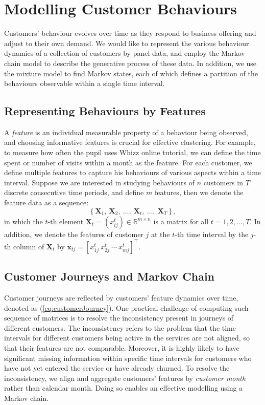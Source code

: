 \section{Modelling Customer Behaviours}
\label{sec:model}

Customers' behaviour evolves over time as they respond to business offering and adjust to their own demand. We would like to represent the various behaviour dynamics of a collection of customers by panel data, and employ the Markov chain model to describe the generative process of these data. In addition, we use the mixture model to find Markov states, each of which defines a partition of the behaviours observable within a single time interval.

\subsection{Representing Behaviours by Features}

A \textit{feature} is an individual measurable property of a behaviour being observed, and choosing informative features is crucial for effective clustering. For example, to measure how often the pupil uses Whizz online tutorial, we can define the time spent or number of visits within a month as the feature. For each customer, we define multiple features to capture his behaviours of various aspects within a time interval. Suppose we are interested in studying behaviours of $n$ customers in $T$ discrete consecutive time periods, and define $m$ features, then we denote the feature data as a sequence:
\begin{equation}
\label{eq:customerJourney}
\left\lbrace \mathbf{X}_1, ~\mathbf{X}_2, ~\dots, ~\mathbf{X}_t, ~\dots, ~\mathbf{X}_T \right\rbrace,
\end{equation}
in which the $t$-th element $\mathbf{X}_t = (x_{ij}^t) \in \mathbb{R}^{m \times n}$ is a matrix for all $t=1,2,\dots,T$. In addition, we denote the features of customer $j$ at the $t$-th time interval by the $j$-th column of $\mathbf{X}_t$ by $\mathbf{x}_{tj} = [x_{1j}^t ~x_{2j}^t ~\cdots ~x_{mj}^t]^\top$.

\subsection{Customer Journeys and Markov Chain}

Customer journeys are reflected by customers' feature dynamics over time, denoted as (\ref{eq:customerJourney}). One practical challenge of computing such sequence of matrices is to resolve the inconsistency present in journeys of different customers. The inconsistency refers to the problem that the time intervals for different customers being active in the services are not aligned, so that their features are not comparable. Moreover, it is highly likely to have significant missing information within specific time intervals for customers who have not yet entered the service or have already churned. To resolve the inconsistency, we align and aggregate customers' features by \textit{customer month} rather than calendar month. Doing so enables an effective modelling using a Markov chain.

